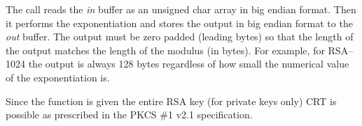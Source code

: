 \documentclass[synpaper]{book}
\begin{document}
The call reads the \textit{in} buffer as an unsigned char array in big endian format.  Then it performs the exponentiation and stores the output in big endian format
to the \textit{out} buffer.  The output must be zero padded (leading bytes) so that the length of the output matches the length of the modulus (in bytes).  For example,
for RSA--1024 the output is always 128 bytes regardless of how small the numerical value of the exponentiation is.

Since the function is given the entire RSA key (for private keys only) CRT is possible as prescribed in the PKCS \#1 v2.1 specification.

\newpage
{}

\end{document}
